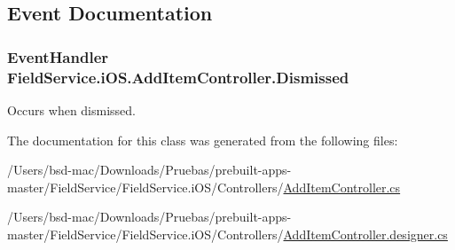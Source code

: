 \subsection{Event Documentation}
\hypertarget{class_field_service_1_1i_o_s_1_1_add_item_controller_a980e00b203141f92a82c4c2166b84ac2}{
\subsubsection[{Dismissed}]{\setlength{\rightskip}{0pt plus 5cm}Event\+Handler Field\+Service.\+i\+O\+S.\+Add\+Item\+Controller.\+Dismissed}}\label{class_field_service_1_1i_o_s_1_1_add_item_controller_a980e00b203141f92a82c4c2166b84ac2}


Occurs when dismissed. 



The documentation for this class was generated from the following files\+:\begin{DoxyCompactItemize}
\item 
/\+Users/bsd-\/mac/\+Downloads/\+Pruebas/prebuilt-\/apps-\/master/\+Field\+Service/\+Field\+Service.\+i\+O\+S/\+Controllers/\hyperlink{_add_item_controller_8cs}{Add\+Item\+Controller.\+cs}\item 
/\+Users/bsd-\/mac/\+Downloads/\+Pruebas/prebuilt-\/apps-\/master/\+Field\+Service/\+Field\+Service.\+i\+O\+S/\+Controllers/\hyperlink{_add_item_controller_8designer_8cs}{Add\+Item\+Controller.\+designer.\+cs}\end{DoxyCompactItemize}

